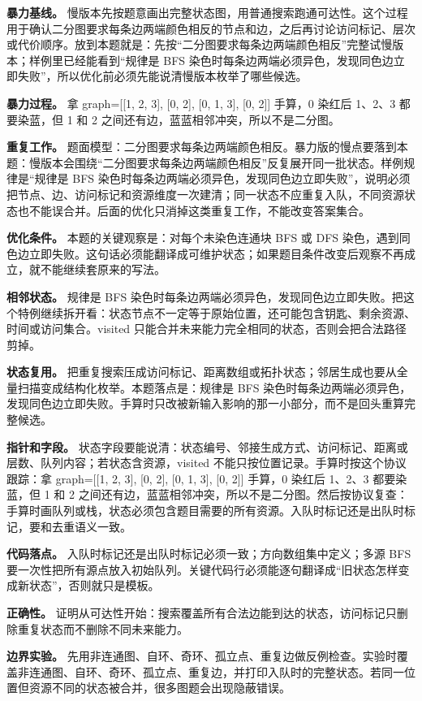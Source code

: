 \textbf{暴力基线。} 慢版本先按题意画出完整状态图，用普通搜索跑通可达性。这个过程用于确认二分图要求每条边两端颜色相反的节点和边，之后再讨论访问标记、层次或代价顺序。放到本题就是：先按“二分图要求每条边两端颜色相反”完整试慢版本；样例里已经能看到“规律是 BFS 染色时每条边两端必须异色，发现同色边立即失败”，所以优化前必须先能说清慢版本枚举了哪些候选。

\textbf{暴力过程。} 拿 graph=[[1, 2, 3], [0, 2], [0, 1, 3], [0, 2]] 手算，0 染红后 1、2、3 都要染蓝，但 1 和 2 之间还有边，蓝蓝相邻冲突，所以不是二分图。

\textbf{重复工作。} 题面模型：二分图要求每条边两端颜色相反。暴力版的慢点要落到本题：慢版本会围绕“二分图要求每条边两端颜色相反”反复展开同一批状态。样例规律是“规律是 BFS 染色时每条边两端必须异色，发现同色边立即失败”，说明必须把节点、边、访问标记和资源维度一次建清；同一状态不应重复入队，不同资源状态也不能误合并。后面的优化只消掉这类重复工作，不能改变答案集合。

\textbf{优化条件。} 本题的关键观察是：对每个未染色连通块 BFS 或 DFS 染色，遇到同色边立即失败。这句话必须能翻译成可维护状态；如果题目条件改变后观察不再成立，就不能继续套原来的写法。

\textbf{相邻状态。} 规律是 BFS 染色时每条边两端必须异色，发现同色边立即失败。把这个特例继续拆开看：状态节点不一定等于原始位置，还可能包含钥匙、剩余资源、时间或访问集合。visited 只能合并未来能力完全相同的状态，否则会把合法路径剪掉。

\textbf{状态复用。} 把重复搜索压成访问标记、距离数组或拓扑状态；邻居生成也要从全量扫描变成结构化枚举。本题落点是：规律是 BFS 染色时每条边两端必须异色，发现同色边立即失败。手算时只改被新输入影响的那一小部分，而不是回头重算完整候选。

\textbf{指针和字段。} 状态字段要能说清：状态编号、邻接生成方式、访问标记、距离或层数、队列内容；若状态含资源，visited 不能只按位置记录。手算时按这个协议跟踪：拿 graph=[[1, 2, 3], [0, 2], [0, 1, 3], [0, 2]] 手算，0 染红后 1、2、3 都要染蓝，但 1 和 2 之间还有边，蓝蓝相邻冲突，所以不是二分图。然后按协议复查：手算时画队列或栈，状态必须包含题目需要的所有资源。入队时标记还是出队时标记，要和去重语义一致。

\textbf{代码落点。} 入队时标记还是出队时标记必须一致；方向数组集中定义；多源 BFS 要一次性把所有源点放入初始队列。关键代码行必须能逐句翻译成“旧状态怎样变成新状态”，否则就只是模板。

\textbf{正确性。} 证明从可达性开始：搜索覆盖所有合法边能到达的状态，访问标记只删除重复状态而不删除不同未来能力。

\textbf{边界实验。} 先用非连通图、自环、奇环、孤立点、重复边做反例检查。实验时覆盖非连通图、自环、奇环、孤立点、重复边，并打印入队时的完整状态。若同一位置但资源不同的状态被合并，很多图题会出现隐蔽错误。

